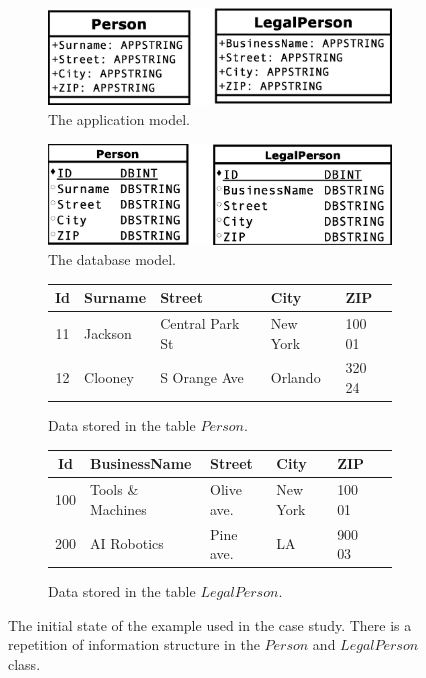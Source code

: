 \documentclass[11pt]{article}
\begin{document}
\begin{figure}
\begin{subfigure}[b]{0.45\textwidth}
	\includegraphics[width=\textwidth]{./images/case_app_1}
	\caption{The application model.}
\end{subfigure}
\quad
\begin{subfigure}[b]{0.45\textwidth}
	\includegraphics[width=\textwidth]{./images/case_db_1}
	\caption{The database model.}
\end{subfigure}
\begin{subfigure}[b]{\textwidth}
	\centering
	\begin{tabular}{| c | l | l | l | l | }
	 	\hline
		Id &  Surname & Street & City & ZIP  \\ \hline  
		11 & Jackson & Central Park St & New York & 100 01  \\ \hline
		12 & Clooney & S Orange Ave & Orlando & 320 24  \\ \hline
	\end{tabular}
	\caption{Data stored in the table $Person$.}
\end{subfigure}
\begin{subfigure}[b]{\textwidth}
	\centering
	\begin{tabular}{| c | l | l | l | l | c |}
	 	\hline
		Id &  BusinessName & Street & City & ZIP \\ \hline  
		100 & Tools \& Machines & Olive ave. & New York & 100 01 \\ \hline
		200 & AI Robotics & Pine ave. & LA & 900 03  \\ \hline
	\end{tabular}
	\caption{Data stored in the table $LegalPerson$.}
\end{subfigure}
	\caption{The initial state of the example used in the case study. There is a repetition of information structure in the $Person$ and $LegalPerson$ class.}
	\label{fig:case1}
\end{figure}
\end{document}
